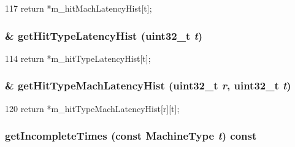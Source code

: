 \begin{DoxyCode}
117     { return *m_hitMachLatencyHist[t]; }
\end{DoxyCode}
\hypertarget{classSequencer_a4996199be67d053287bec8a2fa742ee0}{
\subsubsection[{getHitTypeLatencyHist}]{\& getHitTypeLatencyHist ({\bf uint32\_\-t} {\em t})}}
\label{classSequencer_a4996199be67d053287bec8a2fa742ee0}



\begin{DoxyCode}
114     { return *m_hitTypeLatencyHist[t]; }
\end{DoxyCode}
\hypertarget{classSequencer_a7d6dd3224cae81bef46bd66b8923f3ca}{
\subsubsection[{getHitTypeMachLatencyHist}]{\& getHitTypeMachLatencyHist ({\bf uint32\_\-t} {\em r}, \/  {\bf uint32\_\-t} {\em t})}}
\label{classSequencer_a7d6dd3224cae81bef46bd66b8923f3ca}



\begin{DoxyCode}
120     { return *m_hitTypeMachLatencyHist[r][t]; }
\end{DoxyCode}
\hypertarget{classSequencer_a24bd4dceacbe5dac96e549c7b1b42717}{
\subsubsection[{getIncompleteTimes}]{ getIncompleteTimes (const MachineType {\em t}) const}}
\label{classSequencer_a24bd4dceacbe5dac96e549c7b1b42717}



